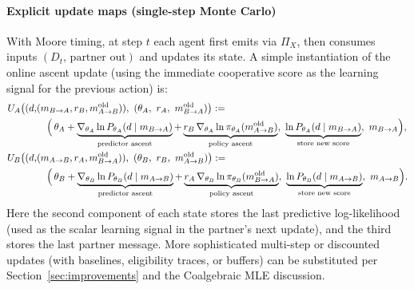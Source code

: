 \documentclass{article}
\theoremstyle{definition}
\begin{document}
\paragraph{Explicit update maps (single-step Monte Carlo)}
With Moore timing, at step $t$ each agent first emits via $\Pi_X$, then consumes inputs $(D_t,\, \text{partner out})$ and updates its state. A simple instantiation of the online ascent update (using the immediate cooperative score as the learning signal for the previous action) is:
\begin{align*}
U_A\bigl((d, &(m_{B\to A}, r_B, m_{A\to B}^{\mathrm{old}})),\ (\theta_A,\ r_A,\ m_{B\to A}^{\mathrm{old}})\bigr)
:=\\
&\quad \Bigl(\,\theta_A
  + \underbrace{\nabla_{\theta_A}\ln P_{\theta_A}(d\mid m_{B\to A})}_{\text{predictor ascent}}
  + \underbrace{r_B\,\nabla_{\theta_A}\ln\pi_{\theta_A}(m_{A\to B}^{\mathrm{old}})}_{\text{policy ascent}},\ 
  \underbrace{\ln P_{\theta_A}(d\mid m_{B\to A})}_{\text{store new score}},\ m_{B\to A}\Bigr),\\
U_B\bigl((d, &(m_{A\to B}, r_A, m_{B\to A}^{\mathrm{old}})),\ (\theta_B,\ r_B,\ m_{A\to B}^{\mathrm{old}})\bigr)
:=\\
&\quad \Bigl(\,\theta_B
  + \underbrace{\nabla_{\theta_B}\ln P_{\theta_B}(d\mid m_{A\to B})}_{\text{predictor ascent}}
  + \underbrace{r_A\,\nabla_{\theta_B}\ln\pi_{\theta_B}(m_{B\to A}^{\mathrm{old}})}_{\text{policy ascent}},\ 
  \underbrace{\ln P_{\theta_B}(d\mid m_{A\to B})}_{\text{store new score}},\ m_{A\to B}\Bigr).
\end{align*}
Here the second component of each state stores the last predictive log-likelihood (used as the scalar learning signal in the partner's next update), and the third stores the last partner message. More sophisticated multi-step or discounted updates (with baselines, eligibility traces, or buffers) can be substituted per Section~\ref{sec:improvements} and the Coalgebraic MLE discussion.
\end{document}
